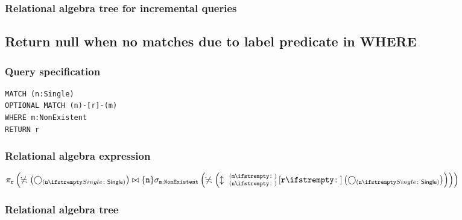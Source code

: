 \subsubsection*{Relational algebra tree for incremental queries}


\subsection{Return null when no matches due to label predicate in WHERE}

\subsubsection*{Query specification}

\begin{lstlisting}
MATCH (n:Single)
OPTIONAL MATCH (n)-[r]-(m)
WHERE m:NonExistent
RETURN r
\end{lstlisting}

\subsubsection*{Relational algebra expression}

$\projection{\var{r}} \left(\alldifferent{} \left(\getvertices{n}{Single}\right) \join \{\var{n}\} \selection{\mathtt{m:NonExistent}} \left(\alldifferent{} \left(\expandboth{n}{m}{}{r}{} \left(\getvertices{n}{Single}\right)\right)\right)\right)$

\subsubsection*{Relational algebra tree}

